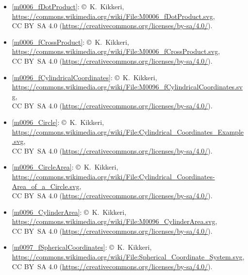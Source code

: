 \begin{itemize}
\item[Fig.] \label{m0006_fDotProduct_Credit}
  \ref{m0006_fDotProduct}:
  \copyright~K.\ Kikkeri, 
  \url{https://commons.wikimedia.org/wiki/File:M0006_fDotProduct.svg},\\ 
  CC BY~SA 4.0 (\url{https://creativecommons.org/licenses/by-sa/4.0/}).

\item[Fig.] \label{m0006_fCrossProduct_Credit}
  \ref{m0006_fCrossProduct}:
  \copyright~K.\ Kikkeri, 
  \url{https://commons.wikimedia.org/wiki/File:M0006_fCrossProduct.svg},\\ 
  CC BY~SA 4.0 (\url{https://creativecommons.org/licenses/by-sa/4.0/}).

\item[Fig.] \label{m0096_fCylindricalCoordinates_Credit}
  \ref{m0096_fCylindricalCoordinates}:
  \copyright~K.\ Kikkeri, 
  \url{https://commons.wikimedia.org/wiki/File:M0096_fCylindricalCoordinates.svg},\\ 
  CC BY~SA 4.0 (\url{https://creativecommons.org/licenses/by-sa/4.0/}).

\item[Fig.] \label{m0096_Circle_Credit}
  \ref{m0096_Circle}:
  \copyright~K.\ Kikkeri, 
  \url{https://commons.wikimedia.org/wiki/File:Cylindrical_Coordinates_Example.svg},\\ 
  CC BY~SA 4.0 (\url{https://creativecommons.org/licenses/by-sa/4.0/}).

\item[Fig.] \label{m0096_CircleArea_Credit}
  \ref{m0096_CircleArea}:
  \copyright~K.\ Kikkeri, 
  \url{https://commons.wikimedia.org/wiki/File:Cylindrical_Coordinates-Area_of_a_Circle.svg},\\ 
  CC BY~SA 4.0 (\url{https://creativecommons.org/licenses/by-sa/4.0/}).

\item[Fig.] \label{m0096_CylinderArea_Credit}
  \ref{m0096_CylinderArea}:
  \copyright~K.\ Kikkeri, 
  \url{https://commons.wikimedia.org/wiki/File:M0096_CylinderArea.svg},\\ 
  CC BY~SA 4.0 (\url{https://creativecommons.org/licenses/by-sa/4.0/}).

\item[Fig.] \label{m0097_fSphericalCoordinates_Credit}
  \ref{m0097_fSphericalCoordinates}:
  \copyright~K.\ Kikkeri, 
  \url{https://commons.wikimedia.org/wiki/File:Spherical_Coordinate_System.svg},\\ 
  CC BY~SA 4.0 (\url{https://creativecommons.org/licenses/by-sa/4.0/}).


\end{itemize}

